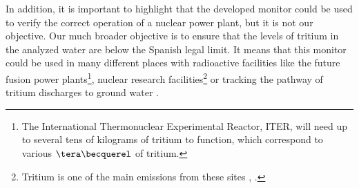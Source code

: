 In addition, it is important to highlight that the developed monitor could be used to verify the correct operation of a nuclear power plant, but it is not our objective. Our much broader objective is to ensure that the levels of tritium in the analyzed water are below the Spanish legal limit. It means that this monitor could be used in many different places with radioactive facilities like the future fusion power plants\footnote{The International Thermonuclear Experimental Reactor, ITER, will need up to several tens of kilograms of tritium to function, which correspond to various $\tera\becquerel$ of tritium.}, nuclear research facilities\footnote{Tritium is one of the main emissions from these sites \cite{FERMILAB}, \cite{BrookHavenNationalLaboratory}.} or tracking the pathway of tritium discharges to ground water \cite{TrackingTritium}. 

